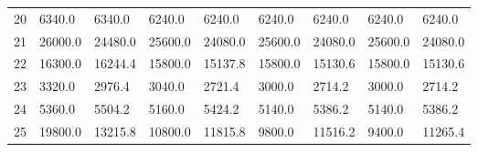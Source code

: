 \begin{tabular}{|r|l|l|l|l|l|l|l|l|}
  20 & 6340.0 & 6340.0 & 6240.0 & 6240.0 & 6240.0 & 6240.0 & 6240.0 & 6240.0 \\ 
  21 & 26000.0 & 24480.0 & 25600.0 & 24080.0 & 25600.0 & 24080.0 & 25600.0 & 24080.0 \\ 
  22 & 16300.0 & 16244.4 & 15800.0 & 15137.8 & 15800.0 & 15130.6 & 15800.0 & 15130.6 \\ 
  23 & 3320.0 & 2976.4 & 3040.0 & 2721.4 & 3000.0 & 2714.2 & 3000.0 & 2714.2 \\ 
  24 & 5360.0 & 5504.2 & 5160.0 & 5424.2 & 5140.0 & 5386.2 & 5140.0 & 5386.2 \\ 
  25 & 19800.0 & 13215.8 & 10800.0 & 11815.8 & 9800.0 & 11516.2 & 9400.0 & 11265.4 \\ 
\end{tabular}
